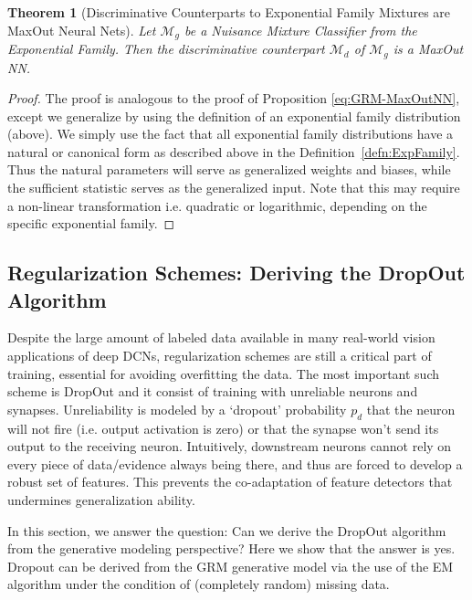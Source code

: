 \documentclass[12pt]{article}
\newtheorem{theorem}{Theorem}[section]
\newcommand{\M}[0]{{ \mathcal{M} }}
\begin{document}
\begin{theorem}[Discriminative Counterparts to Exponential Family Mixtures are MaxOut Neural Nets] \label{thm:DiscrExpFam}
 Let $\M_{g}$ be a Nuisance Mixture Classifier from the Exponential Family. Then the discriminative counterpart $\M_{d}$ of $\M_{g}$ is a MaxOut NN.
\end{theorem}\begin{proof}
The proof is analogous to the proof of Proposition \ref{eq:GRM-MaxOutNN}, except we generalize by using the definition of an exponential family distribution (above). We simply use the fact that all exponential family distributions have a natural or canonical form as described above in the Definition~\ref{defn:ExpFamily}. Thus the natural parameters will serve as generalized weights and biases, while the sufficient statistic serves as the generalized input. Note that this may require a non-linear transformation i.e. quadratic or logarithmic, depending on the specific exponential family.
\end{proof}\subsection{Regularization Schemes: Deriving the DropOut Algorithm}

Despite the large amount of labeled data available in many real-world vision applications of deep DCNs, regularization schemes are still a critical part of training, essential for avoiding overfitting the data. The most important such scheme is DropOut \cite{hinton2012improving} and it consist of training with unreliable neurons and synapses. Unreliability is modeled by a `dropout' probability $p_{d}$ that the neuron will not fire (i.e. output activation is zero) or that the synapse won't send its output to the receiving neuron. Intuitively, downstream neurons cannot rely on every piece of data/evidence always being there, and thus are forced to develop a robust set of features. This prevents the co-adaptation of feature detectors that undermines generalization ability.

In this section, we answer the question: Can we derive the DropOut algorithm from the generative modeling perspective? Here we show that the answer is yes. Dropout can be derived from the GRM generative model via the use of the EM algorithm under the condition of (completely random) missing data.
\end{document}
